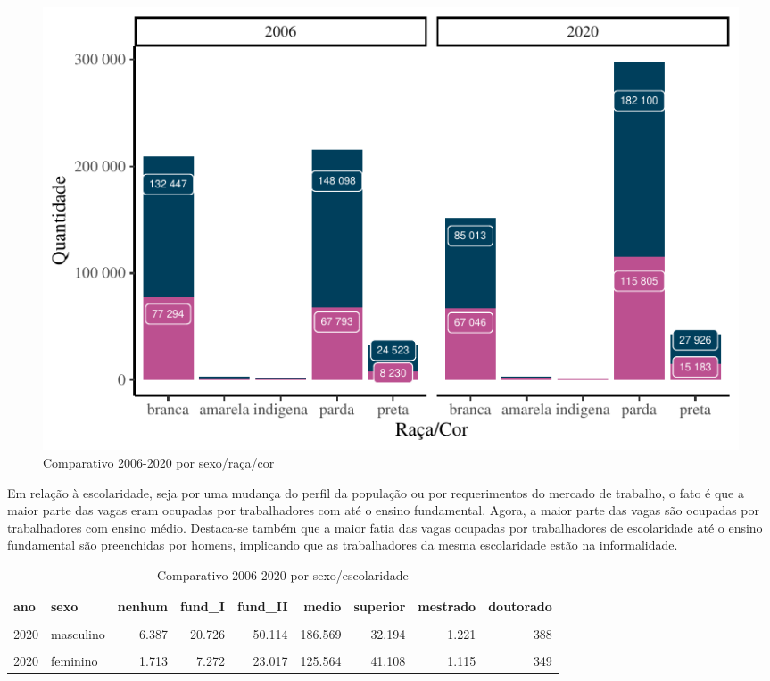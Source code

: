 \documentclass[
  12pt,
  letterpaper,
  DIV=11,
  numbers=noendperiod]{scrartcl}
\begin{document}
\begin{figure}

{\centering \includegraphics[width=1\textwidth,height=\textheight]{monografia_files/figure-pdf/count raca e cor-1.pdf}

}

\caption{Comparativo 2006-2020 por sexo/raça/cor}

\end{figure}

Em relação à escolaridade, seja por uma mudança do perfil da população
ou por requerimentos do mercado de trabalho, o fato é que a maior parte
das vagas eram ocupadas por trabalhadores com até o ensino fundamental.
Agora, a maior parte das vagas são ocupadas por trabalhadores com ensino
médio. Destaca-se também que a maior fatia das vagas ocupadas por
trabalhadores de escolaridade até o ensino fundamental são preenchidas
por homens, implicando que as trabalhadores da mesma escolaridade estão
na informalidade.

\begin{table}
\caption{Comparativo 2006-2020 por sexo/escolaridade}\tabularnewline

\centering
\begin{tabular}[t]{l|l|r|r|r|r|r|r|r}
\hline
ano & sexo & nenhum & fund\_I & fund\_II & medio & superior & mestrado & doutorado\\
\hline
\cellcolor{gray!6}{2006} & \cellcolor{gray!6}{masculino} & \cellcolor{gray!6}{12.540} & \cellcolor{gray!6}{55.070} & \cellcolor{gray!6}{102.279} & \cellcolor{gray!6}{119.303} & \cellcolor{gray!6}{18.927} & \cellcolor{gray!6}{304} & \cellcolor{gray!6}{67}\\
\hline
2020 & masculino & 6.387 & 20.726 & 50.114 & 186.569 & 32.194 & 1.221 & 388\\
\hline
\cellcolor{gray!6}{2006} & \cellcolor{gray!6}{feminino} & \cellcolor{gray!6}{2.254} & \cellcolor{gray!6}{14.361} & \cellcolor{gray!6}{35.675} & \cellcolor{gray!6}{83.778} & \cellcolor{gray!6}{18.782} & \cellcolor{gray!6}{330} & \cellcolor{gray!6}{50}\\
\hline
2020 & feminino & 1.713 & 7.272 & 23.017 & 125.564 & 41.108 & 1.115 & 349\\
\hline
\end{tabular}
\end{table}
\end{document}
